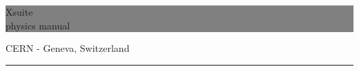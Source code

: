 \documentclass[a4paper,12pt]{book}
\newcommand{\HRule}[1]{\hfill \rule{0.2\linewidth}{#1}}
\begin{document}
\thispagestyle{empty} %


\colorbox{Gray}{
	\parbox[t]{1.0\linewidth}{
		\centering \fontsize{28pt}{40pt}\selectfont %
		\vspace*{0.7cm} %
		
		\hfill Xsuite \\
		\hfill physics manual

		
		\vspace*{0.7cm} %
	}
}


                \vfill


{\centering \large 
\hfill CERN - Geneva, Switzerland

\HRule{1pt}} %


\clearpage %

\newpage

\tableofcontents

\newpage


\renewcommand*{\arraystretch}{1.4}










\end{document}
